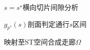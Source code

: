 \begin{subfigure}[b]{0.32\textwidth}
  \centering
  \caption{$s=s^\star$横向切片间隙分析}
\end{subfigure}\hfill
\begin{subfigure}[b]{0.32\textwidth}
  \centering
  \caption{$g_{p^*}(s)$剖面判定通行$s$区间}
\end{subfigure}\hfill
\begin{subfigure}[b]{0.32\textwidth}
  \centering
  \caption{映射至ST空间合成走廊$\Omega$}
\end{subfigure}
